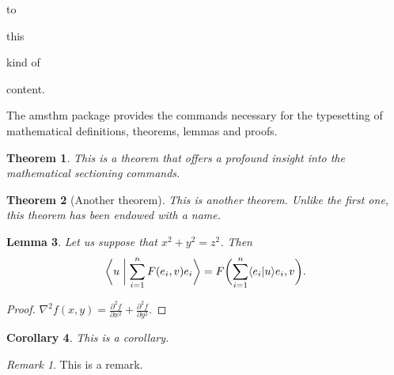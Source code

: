 \documentclass[
  digital, %
  table,   %
  lof,     %
  lot,     %
]{fithesis3}
\begin{document}
\begin{compactenum}
  \item to
  \begin{compactenum}
    \item this
    \begin{compactenum}
      \item kind of
      \begin{compactenum}
        \item content.
      \end{compactenum}
    \end{compactenum}
  \end{compactenum}
\end{compactenum}
The \textsf{amsthm} package provides the commands necessary for the
typesetting of mathematical definitions, theorems, lemmas and
proofs.

\newtheorem{theorem}{Theorem}[section] %
\newtheorem{lemma}[theorem]{Lemma}         %
\newtheorem{corollary}[theorem]{Corollary} %
\theoremstyle{definition}
\newtheorem{definition}{Definition}
\theoremstyle{remark}
\newtheorem*{remark}{Remark}

\begin{theorem}
  This is a theorem that offers a profound insight into the
  mathematical sectioning commands.
\end{theorem}
\begin{theorem}[Another theorem]
  This is another theorem. Unlike the first one, this theorem has
  been endowed with a name.
\end{theorem}
\begin{lemma}
  Let us suppose that $x^2+y^2=z^2$. Then
  \begin{equation}
    \biggl\langle u\biggm|\sum_{i=1}^nF(e_i,v)e_i\biggr\rangle
    =F\biggl(\sum_{i=1}^n\langle e_i|u\rangle e_i,v\biggr).
  \end{equation}
\end{lemma}
\begin{proof}
  $\nabla^2 f(x,y)=\frac{\partial^2f}{\partial x^2}+
   \frac{\partial^2f}{\partial y^2}$.
\end{proof}
\begin{corollary}
  This is a corollary.
\end{corollary}
\begin{remark}
  This is a remark.
\end{remark}
\end{document}
